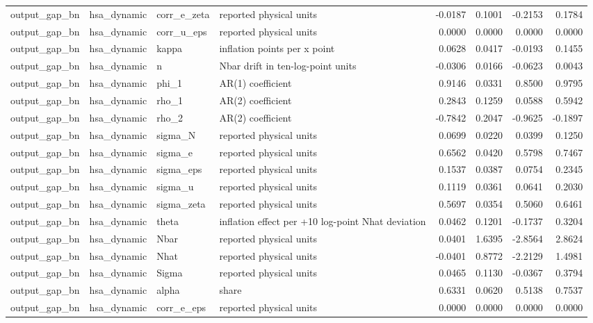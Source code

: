\begin{tabular}{llllrrrr}
output\_gap\_bn & hsa\_dynamic & corr\_e\_zeta & reported physical units & -0.0187 & 0.1001 & -0.2153 & 0.1784 \\
output\_gap\_bn & hsa\_dynamic & corr\_u\_eps & reported physical units & 0.0000 & 0.0000 & 0.0000 & 0.0000 \\
output\_gap\_bn & hsa\_dynamic & kappa & inflation points per x point & 0.0628 & 0.0417 & -0.0193 & 0.1455 \\
output\_gap\_bn & hsa\_dynamic & n & Nbar drift in ten-log-point units & -0.0306 & 0.0166 & -0.0623 & 0.0043 \\
output\_gap\_bn & hsa\_dynamic & phi\_1 & AR(1) coefficient & 0.9146 & 0.0331 & 0.8500 & 0.9795 \\
output\_gap\_bn & hsa\_dynamic & rho\_1 & AR(2) coefficient & 0.2843 & 0.1259 & 0.0588 & 0.5942 \\
output\_gap\_bn & hsa\_dynamic & rho\_2 & AR(2) coefficient & -0.7842 & 0.2047 & -0.9625 & -0.1897 \\
output\_gap\_bn & hsa\_dynamic & sigma\_N & reported physical units & 0.0699 & 0.0220 & 0.0399 & 0.1250 \\
output\_gap\_bn & hsa\_dynamic & sigma\_e & reported physical units & 0.6562 & 0.0420 & 0.5798 & 0.7467 \\
output\_gap\_bn & hsa\_dynamic & sigma\_eps & reported physical units & 0.1537 & 0.0387 & 0.0754 & 0.2345 \\
output\_gap\_bn & hsa\_dynamic & sigma\_u & reported physical units & 0.1119 & 0.0361 & 0.0641 & 0.2030 \\
output\_gap\_bn & hsa\_dynamic & sigma\_zeta & reported physical units & 0.5697 & 0.0354 & 0.5060 & 0.6461 \\
output\_gap\_bn & hsa\_dynamic & theta & inflation effect per +10 log-point Nhat deviation & 0.0462 & 0.1201 & -0.1737 & 0.3204 \\
output\_gap\_bn & hsa\_dynamic & Nbar & reported physical units & 0.0401 & 1.6395 & -2.8564 & 2.8624 \\
output\_gap\_bn & hsa\_dynamic & Nhat & reported physical units & -0.0401 & 0.8772 & -2.2129 & 1.4981 \\
output\_gap\_bn & hsa\_dynamic & Sigma & reported physical units & 0.0465 & 0.1130 & -0.0367 & 0.3794 \\
output\_gap\_bn & hsa\_dynamic & alpha & share & 0.6331 & 0.0620 & 0.5138 & 0.7537 \\
output\_gap\_bn & hsa\_dynamic & corr\_e\_eps & reported physical units & 0.0000 & 0.0000 & 0.0000 & 0.0000 \\

\end{tabular}
